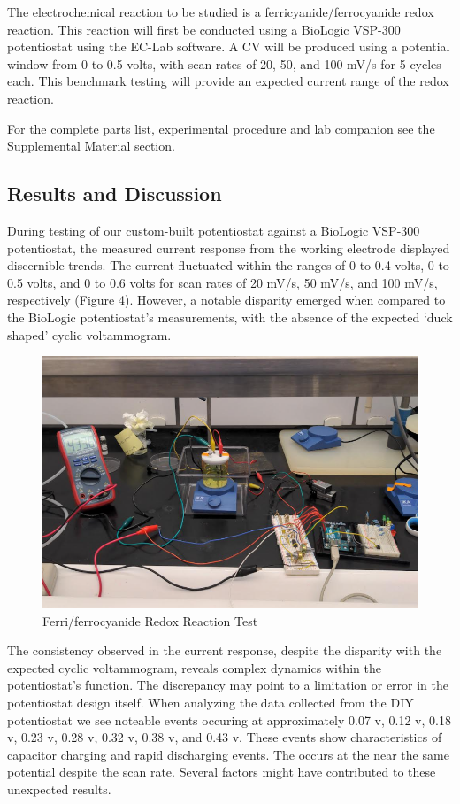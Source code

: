 \documentclass{article}
\begin{document}
The electrochemical reaction to be studied is a ferricyanide/ferrocyanide redox reaction. This reaction will first be conducted using a BioLogic VSP-300 potentiostat using the EC-Lab software. A CV will be produced using a potential window from 0 to 0.5 volts, with scan rates of 20, 50, and 100 mV/s for 5 cycles each. This benchmark testing will provide an expected current range of the redox reaction. 

For the complete parts list, experimental procedure and lab companion see the Supplemental Material section.

\subsection*{Results and Discussion}
During testing of our custom-built potentiostat against a BioLogic VSP-300 potentiostat, the measured current response from the working electrode displayed discernible trends. The current fluctuated within the ranges of 0 to 0.4 volts, 0 to 0.5 volts, and 0 to 0.6 volts for scan rates of 20 mV/s, 50 mV/s, and 100 mV/s, respectively (Figure 4). However, a notable disparity emerged when compared to the BioLogic potentiostat's measurements, with the absence of the expected `duck shaped' cyclic voltammogram.

\begin{figure}[H]
  \centering
  \includegraphics[width=.9\linewidth]{lab_test.png}
  \caption{Ferri/ferrocyanide Redox Reaction Test}
\end{figure}

The consistency observed in the current response, despite the disparity with the expected cyclic voltammogram, reveals complex dynamics within the potentiostat's function. The discrepancy may point to a limitation or error in the potentiostat design itself. When analyzing the data collected from the DIY potentiostat we see noteable events occuring at approximately 0.07 v, 0.12 v, 0.18 v, 0.23 v, 0.28 v, 0.32 v, 0.38 v, and 0.43 v. These events show characteristics of capacitor charging and rapid discharging events. The occurs at the near the same potential despite the scan rate. Several factors might have contributed to these unexpected results.
\end{document}
